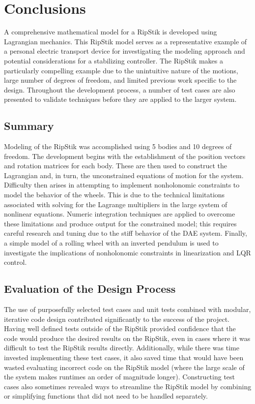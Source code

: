 \section{Conclusions}
A comprehensive mathematical model for a RipStik is developed using Lagrangian mechanics.
This RipStik model serves as a representative example of a personal electric transport device for investigating the modeling approach and potential considerations for a stabilizing controller. 
The RipStik makes a particularly compelling example due to the unintuitive nature of the motions, large number of degrees of freedom, and limited previous work specific to the design.
Throughout the development process, a number of test cases are also presented to validate techniques before they are applied to the larger system. 
\subsection{Summary}
Modeling of the RipStik was accomplished using 5 bodies and 10 degrees of freedom.
The development begins with the establishment of the position vectors and rotation matrices for each body.
These are then used to construct the Lagrangian and, in turn, the unconstrained equations of motion for the system.
Difficulty then arises in attempting to implement nonholonomic constraints to model the behavior of the wheels.
This is due to the technical limitations associated with solving for the Lagrange multipliers in the large system of nonlinear equations. 
Numeric integration techniques are applied to overcome these limitations and produce output for the constrained model; this requires careful research and tuning due to the stiff behavior of the DAE system.
Finally, a simple model of a rolling wheel with an inverted pendulum is used to investigate the implications of nonholonomic constraints in linearization and LQR control.
\subsection{Evaluation of the Design Process}
The use of purposefully selected test cases and unit tests combined with modular, iterative code design contributed significantly to the success of the project. 
Having well defined tests outside of the RipStik provided confidence that the code would produce the desired results on the RipStik, even in cases where it was difficult to test the RipStik results directly. 
Additionally, while there was time invested implementing these test cases, it also saved time that would have been wasted evaluating incorrect code on the RipStik model (where the large scale of the system makes runtimes an order of magnitude longer). 
Constructing test cases also sometimes revealed ways to streamline the RipStik model by combining or simplifying functions that did not need to be handled separately.

